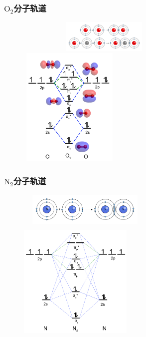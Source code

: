 \frame
{
	\frametitle{$\mathrm{O}_2$分子轨道}
\begin{figure}[h!]
\centering
\vspace{-15.5pt}
\includegraphics[height=0.60in,width=3.35in,viewport=0 100 500 200,clip]{Figures/Octet-Rule-O2_CO2.png}
\includegraphics[height=2.25in,width=1.90in,viewport=0 0 150 170,clip]{Figures/MO-O2.png}
\label{MO:O2}
\end{figure}
}

\frame
{
	\frametitle{$\mathrm{N}_2$分子轨道}
\begin{figure}[h!]
\centering
\vspace{-10.5pt}
\includegraphics[height=0.60in,width=2.55in,viewport=0 0 500 130,clip]{Figures/Octet-Rule-N2.png}
\includegraphics[height=2.30in,width=2.15in,viewport=0 0 160 150,clip]{Figures/MO-N2.png}
\label{MO:N2}
\end{figure}
}

